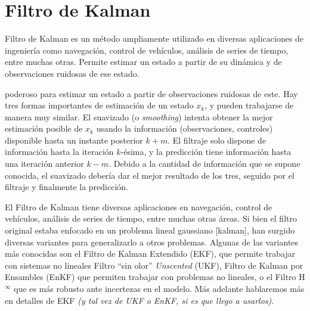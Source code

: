 \section{Filtro de Kalman}\label{sec:kalman}


Filtro de Kalman es un método ampliamente utilizado en diversas aplicaciones de ingeniería como navegación, control de vehículos, análisis de series de tiempo, entre muchas otras. Permite estimar un estado a partir de su dinámica y de observaciones ruidosas de ese estado.


poderoso para estimar un estado a partir de observaciones ruidosas de este. Hay tres formas importantes de estimación de un estado \(x_k\), y pueden trabajarse de manera muy similar. El suavizado (o \emph{smoothing}) intenta obtener la mejor estimación posible de \(x_k\) usando la información (observaciones, controles) disponible hasta un instante posterior \(k+m\). El filtraje solo dispone de información hasta la iteración \(k\)-ésima, y la predicción tiene información hasta una iteración anterior \(k-m\). Debido a la cantidad de información que se supone conocida, el suavizado debería dar el mejor resultado de los tres, seguido por el filtraje y finalmente la predicción. 

El Filtro de Kalman tiene diversas aplicaciones en navegación, control de vehículos, análisis de series de tiempo, entre muchas otras áreas. Si bien el filtro original estaba enfocado en un problema lineal gaussiano [kalman], han surgido diversas variantes para generalizarlo a otros problemas. Algunas de las variantes más conocidas son el Filtro de Kalman Extendido (EKF), que permite trabajar con sistemas no lineales Filtro ``sin olor'' \textit{Unscented} (UKF), Filtro de Kalman por Ensambles (EnKF) que permiten trabajar con problemas no lineales, o el Filtro H\(^\infty\) que es más robusto ante incertezas en el modelo. Más adelante hablaremos más en detalles de EKF \textit{(y tal vez de UKF o EnKF, si es que llego a usarlos)}.


